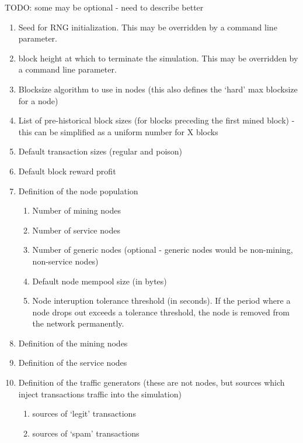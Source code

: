 \documentclass{scrreprt}
\begin{document}
        TODO: some may be optional - need to describe better

        \begin{enumerate}
          \item Seed for RNG initialization.
            This may be overridden by a command line parameter.
          \item block height at which to terminate the simulation.
            This may be overridden by a command line parameter.
          \item Blocksize algorithm to use in nodes (this also defines the
            `hard' max blocksize for a node)
          \item List of pre-historical block sizes (for blocks preceding the
            first mined block) - this can be simplified as a uniform number for X
            blocks
          \item Default transaction sizes (regular and poison)
          \item Default block reward profit
          \item Definition of the node population
            \begin{enumerate}
              \item Number of mining nodes
              \item Number of service nodes
              \item Number of generic nodes (optional - generic nodes would be
                non-mining, non-service nodes)
              \item Default node mempool size (in bytes)
              \item Node interuption tolerance threshold (in seconds).
                If the period where a node drops out exceeds a tolerance threshold,
                the node is removed from the network permanently.
            \end{enumerate}
          \item Definition of the mining nodes
          \item Definition of the service nodes
          \item Definition of the traffic generators (these are not nodes, but
            sources which inject transactions traffic into the simulation)
            \begin{enumerate}
              \item sources of `legit' transactions
              \item sources of `spam' transactions
            \end{enumerate}
        \end{enumerate}
\end{document}
